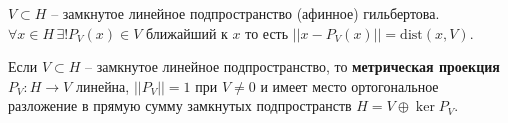 
\begin{to_thr}
	$V\subset H$ -- замкнутое линейное подпространство (афинное) гильбертова. $\forall x \in H \, \exists ! P_V(x) \in V$ ближайший к $x$ то есть $||x - P_V(x)|| = \text{dist} (x,V)$.
\end{to_thr}

\begin{to_thr}
	Если $V\subset H$ -- замкнутое линейное подпространство, то \textbf{метрическая проекция} $P_V \colon H \to V$ линейна, $||P_V|| = 1$ при $V \neq 0$ и имеет место ортогональное разложение в прямую сумму замкнутых подпространств $H = V \oplus \ker P_V$.
\end{to_thr}